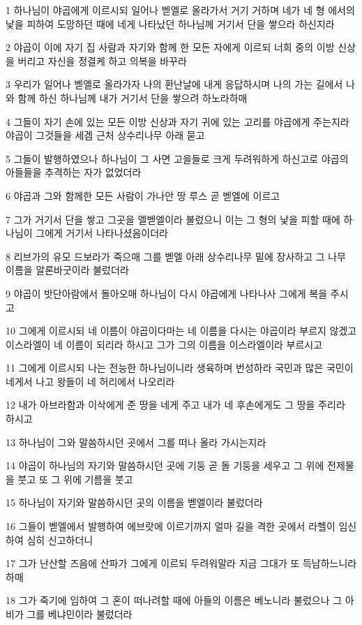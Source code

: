 \par 1 하나님이 야곱에게 이르시되 일어나 벧엘로 올라가서 거기 거하며 네가 네 형 에서의 낯을 피하여 도망하던 때에 네게 나타났던 하나님께 거기서 단을 쌓으라 하신지라
\par 2 야곱이 이에 자기 집 사람과 자기와 함께 한 모든 자에게 이르되 너희 중의 이방 신상을 버리고 자신을 정결케 하고 의복을 바꾸라
\par 3 우리가 일어나 벧엘로 올라가자 나의 환난날에 내게 응답하시며 나의 가는 길에서 나와 함께 하신 하나님께 내가 거기서 단을 쌓으려 하노라하매
\par 4 그들이 자기 손에 있는 모든 이방 신상과 자기 귀에 있는 고리를 야곱에게 주는지라 야곱이 그것들을 세겜 근처 상수리나무 아래 묻고
\par 5 그들이 발행하였으나 하나님이 그 사면 고을들로 크게 두려워하게 하신고로 야곱의 아들들을 추격하는 자가 없었더라
\par 6 야곱과 그와 함께한 모든 사람이 가나안 땅 루스 곧 벧엘에 이르고
\par 7 그가 거기서 단을 쌓고 그곳을 엘벧엘이라 불렀으니 이는 그 형의 낯을 피할 때에 하나님이 그에게 거기서 나타나셨음이더라
\par 8 리브가의 유모 드보라가 죽으매 그를 벧엘 아래 상수리나무 밑에 장사하고 그 나무 이름을 알론바굿이라 불렀더라
\par 9 야곱이 밧단아람에서 돌아오매 하나님이 다시 야곱에게 나타나사 그에게 복을 주시고
\par 10 그에게 이르시되 네 이름이 야곱이다마는 네 이름을 다시는 야곱이라 부르지 않겠고 이스라엘이 네 이름이 되리라 하시고 그가 그의 이름을 이스라엘이라 부르시고
\par 11 그에게 이르시되 나는 전능한 하나님이니라 생육하며 번성하라 국민과 많은 국민이 네게서 나고 왕들이 네 허리에서 나오리라
\par 12 내가 아브라함과 이삭에게 준 땅을 네게 주고 내가 네 후손에게도 그 땅을 주리라 하시고
\par 13 하나님이 그와 말씀하시던 곳에서 그를 떠나 올라 가시는지라
\par 14 야곱이 하나님의 자기와 말씀하시던 곳에 기둥 곧 돌 기둥을 세우고 그 위에 전제물을 붓고 또 그 위에 기름을 붓고
\par 15 하나님이 자기와 말씀하시던 곳의 이름을 벧엘이라 불렀더라
\par 16 그들이 벧엘에서 발행하여 에브랏에 이르기까지 얼마 길을 격한 곳에서 라헬이 임신하여 심히 신고하더니
\par 17 그가 난산할 즈음에 산파가 그에게 이르되 두려워말라 지금 그대가 또 득남하느니라 하매
\par 18 그가 죽기에 임하여 그 혼이 떠나려할 때에 아들의 이름은 베노니라 불렀으나 그 아비가 그를 베냐민이라 불렀더라
